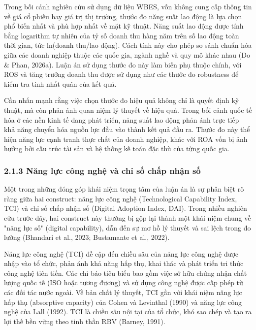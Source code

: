 \documentclass[12pt,a4paper]{article}
\begin{document}
Trong bối cảnh nghiên cứu sử dụng dữ liệu WBES, vốn không cung cấp thông
tin về giá cổ phiếu hay giá trị thị trường, thước đo năng suất lao động
là lựa chọn phổ biến nhất và phù hợp nhất về mặt kỹ thuật. Năng suất lao
động được tính bằng logarithm tự nhiên của tỷ số doanh thu hàng năm trên
số lao động toàn thời gian, tức ln(doanh thu/lao động). Cách tính này
cho phép so sánh chuẩn hóa giữa các doanh nghiệp thuộc các quốc gia,
ngành nghề và quy mô khác nhau (Do \& Phan, 2026a). Luận án sử dụng
thước đo này làm biến phụ thuộc chính, với ROS và tăng trưởng doanh thu
được sử dụng như các thước đo robustness để kiểm tra tính nhất quán của
kết quả.

Cần nhấn mạnh rằng việc chọn thước đo hiệu quả không chỉ là quyết định
kỹ thuật, mà còn phản ánh quan niệm lý thuyết về hiệu quả. Trong bối
cảnh quốc tế hóa ở các nền kinh tế đang phát triển, năng suất lao động
phản ánh trực tiếp khả năng chuyển hóa nguồn lực đầu vào thành kết quả
đầu ra. Thước đo này thể hiện năng lực cạnh tranh thực chất của doanh
nghiệp, khác với ROA vốn bị ảnh hưởng bởi cấu trúc tài sản và hệ thống
kế toán đặc thù của từng quốc gia.

\hypertarget{213-nux103ng-lux1ef1c-cuxf4ng-nghux1ec7-vuxe0-chux1ec9-sux1ed1-chux1ea5p-nhux1eadn-sux1ed1}{%
\subsubsection{2.1.3 Năng lực công nghệ và chỉ số chấp nhận
số}\label{213-nux103ng-lux1ef1c-cuxf4ng-nghux1ec7-vuxe0-chux1ec9-sux1ed1-chux1ea5p-nhux1eadn-sux1ed1}}

Một trong những đóng góp khái niệm trọng tâm của luận án là sự phân biệt
rõ ràng giữa hai construct: năng lực công nghệ (Technological Capability
Index, TCI) và chỉ số chấp nhận số (Digital Adoption Index, DAI). Trong
nhiều nghiên cứu trước đây, hai construct này thường bị gộp lại thành
một khái niệm chung về "năng lực số" (digital capability), dẫn đến sự mơ
hồ lý thuyết và sai lệch trong đo lường (Bhandari et al., 2023;
Bustamante et al., 2022).

Năng lực công nghệ (TCI) đề cập đến chiều sâu của năng lực công nghệ
được nhập vào tổ chức, phản ánh khả năng hấp thụ, khai thác và phát
triển tri thức công nghệ tiên tiến. Các chỉ báo tiêu biểu bao gồm việc
sở hữu chứng nhận chất lượng quốc tế (ISO hoặc tương đương) và sử dụng
công nghệ được cấp phép từ các đối tác nước ngoài. Về bản chất lý
thuyết, TCI gần với khái niệm năng lực hấp thụ (absorptive capacity) của
Cohen và Levinthal (1990) và năng lực công nghệ của Lall (1992). TCI là
chiều sâu nội tại của tổ chức, khó sao chép và tạo ra lợi thế bền vững
theo tinh thần RBV (Barney, 1991).
\end{document}
